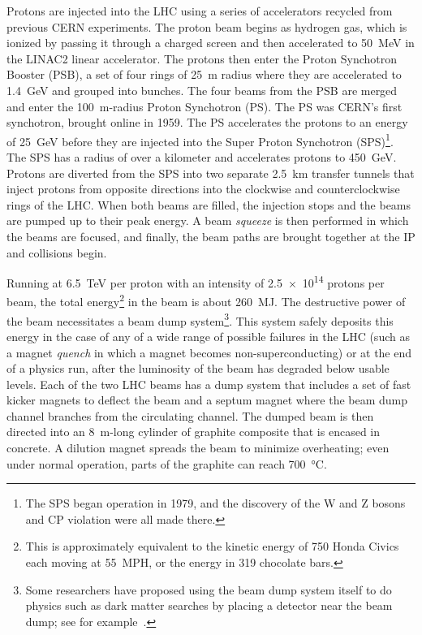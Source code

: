 Protons are injected into the LHC using a series of accelerators recycled from
previous CERN experiments. The proton beam begins as hydrogen gas, which is
ionized by passing it through a charged screen and then accelerated to
\SI{50}{\mega eV} in the LINAC2 linear accelerator. The protons then enter the
Proton Synchotron Booster (PSB), a set of four rings of \SI{25}{\meter} radius
where they are accelerated to \SI{1.4}{\giga eV} and grouped into bunches. The
four beams from the PSB are merged and enter the \SI{100}{\meter}-radius Proton
Synchotron (PS). The PS was CERN's first synchotron, brought online in 1959. The
PS accelerates the protons to an energy of \SI{25}{GeV} before they are injected
into the Super Proton Synchotron (SPS)\footnote{The SPS began operation in 1979,
and the discovery of the W and Z bosons and CP violation were all made there.}.
The SPS has a radius of over a kilometer and accelerates protons to
\SI{450}{\giga eV}. Protons are diverted from the SPS into two separate
\SI{2.5}{\km} transfer tunnels that inject protons from opposite directions into
the clockwise and counterclockwise rings of the LHC. When both beams are filled,
the injection stops and the beams are pumped up to their peak energy. A beam
\textit{squeeze} is then performed in which the beams are focused, and finally,
the beam paths are brought together at the IP and collisions begin.

Running at \SI{6.5}{TeV} per proton with an intensity of \num{2.5e14} protons
per beam, the total energy\footnote{This is approximately equivalent to the
kinetic energy of 750 Honda Civics each moving at \SI{55}{MPH}, or the energy in
\num{319} chocolate bars.} in the beam is about \SI{260}{MJ}. The destructive
power of the beam necessitates a beam dump system\footnote{Some researchers have
proposed using the beam dump system itself to do physics such as dark matter
searches by placing a detector near the beam dump; see for
example~\cite{Kumar:2016qfv}.}. This system safely deposits this energy in the
case of any of a wide range of possible failures in the LHC (such as a magnet
\textit{quench} in which a magnet becomes non-superconducting) or at the end of
a physics run, after the luminosity of the beam has degraded below usable
levels. Each of the two LHC beams has a dump system that includes a set of fast
kicker magnets to deflect the beam and a septum magnet where the beam dump
channel branches from the circulating channel. The dumped beam is then directed
into an \SI{8}{\meter}-long cylinder of graphite composite that is encased in
concrete. A dilution magnet spreads the beam to minimize overheating; even under
normal operation, parts of the graphite can reach \SI{700}{\celsius}.

